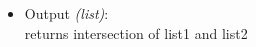 \begin{itemize}
\begin{itemize}
 \item Output \textit{(list)}: \\
 returns intersection of list1 and list2
 \end{itemize} 
 
 
 
 
 
 
\end{itemize}


